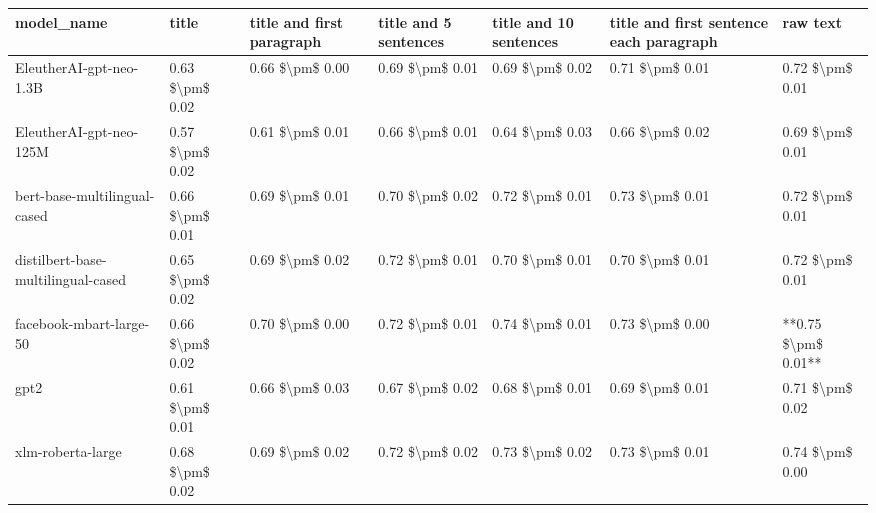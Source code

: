 \begin{tabular}{lllllll}
\toprule
                        model\_name &           title & title and first paragraph & title and 5 sentences & title and 10 sentences & title and first sentence each paragraph &            raw text \\
\midrule
           EleutherAI-gpt-neo-1.3B & 0.63 \$\textbackslash pm\$ 0.02 &           0.66 \$\textbackslash pm\$ 0.00 &       0.69 \$\textbackslash pm\$ 0.01 &        0.69 \$\textbackslash pm\$ 0.02 &                         0.71 \$\textbackslash pm\$ 0.01 &     0.72 \$\textbackslash pm\$ 0.01 \\
           EleutherAI-gpt-neo-125M & 0.57 \$\textbackslash pm\$ 0.02 &           0.61 \$\textbackslash pm\$ 0.01 &       0.66 \$\textbackslash pm\$ 0.01 &        0.64 \$\textbackslash pm\$ 0.03 &                         0.66 \$\textbackslash pm\$ 0.02 &     0.69 \$\textbackslash pm\$ 0.01 \\
      bert-base-multilingual-cased & 0.66 \$\textbackslash pm\$ 0.01 &           0.69 \$\textbackslash pm\$ 0.01 &       0.70 \$\textbackslash pm\$ 0.02 &        0.72 \$\textbackslash pm\$ 0.01 &                         0.73 \$\textbackslash pm\$ 0.01 &     0.72 \$\textbackslash pm\$ 0.01 \\
distilbert-base-multilingual-cased & 0.65 \$\textbackslash pm\$ 0.02 &           0.69 \$\textbackslash pm\$ 0.02 &       0.72 \$\textbackslash pm\$ 0.01 &        0.70 \$\textbackslash pm\$ 0.01 &                         0.70 \$\textbackslash pm\$ 0.01 &     0.72 \$\textbackslash pm\$ 0.01 \\
           facebook-mbart-large-50 & 0.66 \$\textbackslash pm\$ 0.02 &           0.70 \$\textbackslash pm\$ 0.00 &       0.72 \$\textbackslash pm\$ 0.01 &        0.74 \$\textbackslash pm\$ 0.01 &                         0.73 \$\textbackslash pm\$ 0.00 & **0.75 \$\textbackslash pm\$ 0.01** \\
                              gpt2 & 0.61 \$\textbackslash pm\$ 0.01 &           0.66 \$\textbackslash pm\$ 0.03 &       0.67 \$\textbackslash pm\$ 0.02 &        0.68 \$\textbackslash pm\$ 0.01 &                         0.69 \$\textbackslash pm\$ 0.01 &     0.71 \$\textbackslash pm\$ 0.02 \\
                 xlm-roberta-large & 0.68 \$\textbackslash pm\$ 0.02 &           0.69 \$\textbackslash pm\$ 0.02 &       0.72 \$\textbackslash pm\$ 0.02 &        0.73 \$\textbackslash pm\$ 0.02 &                         0.73 \$\textbackslash pm\$ 0.01 &     0.74 \$\textbackslash pm\$ 0.00 \\
\bottomrule
\end{tabular}
